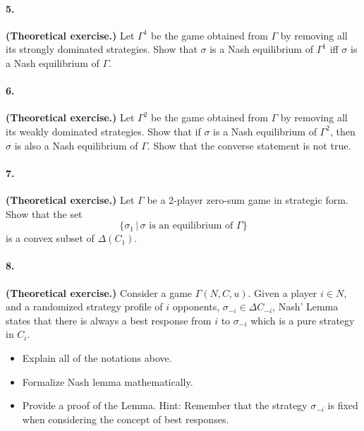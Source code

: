 \documentclass[a4paper,notitlepage,12pt]{article}
\begin{document}

\paragraph{5. } \textbf{(Theoretical exercise.)} Let $\Gamma^1$ be the game obtained from $\Gamma$ by removing all its strongly dominated strategies. Show that $\sigma$ is a Nash equilibrium of $\Gamma^1$ iff $\sigma$ is a Nash equilibrium of $\Gamma$.

\paragraph{6. } \textbf{(Theoretical exercise.)} Let $\Gamma^2$ be the game obtained from $\Gamma$ by removing all its weakly dominated strategies. Show that if $\sigma$ is a Nash equilibrium of $\Gamma^2$, then $\sigma$ is also a Nash equilibrium of $\Gamma$. Show that the converse statement is not true.

\paragraph{7. } \textbf{(Theoretical exercise.)} Let $\Gamma$ be a 2-player zero-sum game in strategic form. Show that the set $$\{ \sigma_1 \, | \, \sigma \text{ is an equilibrium of } \Gamma \}$$ is a convex subset of $\Delta(C_1)$.

\paragraph{8. } \textbf{(Theoretical exercise.)} Consider a game $\Gamma(N,C,u)$. Given a player $i \in N$, and a randomized strategy profile of $i$ opponents, $\sigma_{-i} \in \Delta C_{-i}$, Nash' Lemma states that there is always a best response from $i$ to $\sigma_{-i}$ which is a pure strategy in $C_i$. 
\begin{itemize}
\item Explain all of the notations above.
\item Formalize Nash lemma mathematically.
\item Provide a proof of the Lemma. Hint: Remember that the strategy $\sigma_{-i}$ is fixed when considering the concept of best responses. 
\end{itemize} 
\end{document}
